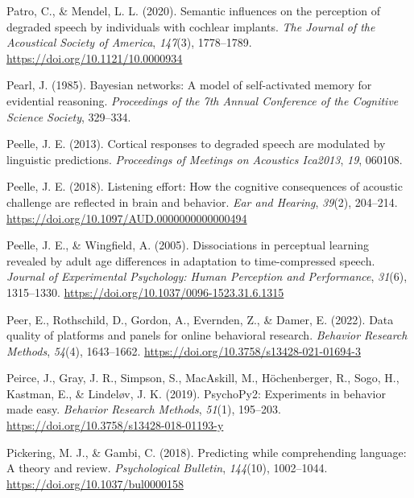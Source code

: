 \documentclass[a4paper, nobind]{templates/ociamthesis}
\newlength{\cslhangindent}
\newenvironment{CSLReferences}[2] %
 {%
  \setlength{\parindent}{0pt}
  \ifodd #1
  \let\oldpar\par
  \def\par{\hangindent=\cslhangindent\oldpar}
  \fi
  \setlength{\parskip}{1mm}
  \setlength{\baselineskip}{6mm}
 }%
 {}
\begin{document}
\begin{CSLReferences}{1}{0}
\leavevmode{}%
Patro, C., \& Mendel, L. L. (2020). Semantic influences on the perception of degraded speech by individuals with cochlear implants. \emph{The Journal of the Acoustical Society of America}, \emph{147}(3), 1778--1789. \url{https://doi.org/10.1121/10.0000934}

\leavevmode{}%
Pearl, J. (1985). {Bayesian networks: A model of self-activated memory for evidential reasoning}. \emph{Proceedings of the 7th Annual Conference of the Cognitive Science Society}, 329--334.

\leavevmode{}%
Peelle, J. E. (2013). Cortical responses to degraded speech are modulated by linguistic predictions. \emph{Proceedings of Meetings on Acoustics Ica2013}, \emph{19}, 060108.

\leavevmode{}%
Peelle, J. E. (2018). {Listening effort: How the cognitive consequences of acoustic challenge are reflected in brain and behavior}. \emph{Ear and Hearing}, \emph{39}(2), 204--214. \url{https://doi.org/10.1097/AUD.0000000000000494}

\leavevmode{}%
Peelle, J. E., \& Wingfield, A. (2005). {Dissociations in perceptual learning revealed by adult age differences in adaptation to time-compressed speech}. \emph{Journal of Experimental Psychology: Human Perception and Performance}, \emph{31}(6), 1315--1330. \url{https://doi.org/10.1037/0096-1523.31.6.1315}

\leavevmode{}%
Peer, E., Rothschild, D., Gordon, A., Evernden, Z., \& Damer, E. (2022). {Data quality of platforms and panels for online behavioral research}. \emph{Behavior Research Methods}, \emph{54}(4), 1643--1662. \url{https://doi.org/10.3758/s13428-021-01694-3}

\leavevmode{}%
Peirce, J., Gray, J. R., Simpson, S., MacAskill, M., Höchenberger, R., Sogo, H., Kastman, E., \& Lindeløv, J. K. (2019). {PsychoPy2: Experiments in behavior made easy}. \emph{Behavior Research Methods}, \emph{51}(1), 195--203. \url{https://doi.org/10.3758/s13428-018-01193-y}

\leavevmode{}%
Pickering, M. J., \& Gambi, C. (2018). Predicting while comprehending language: A theory and review. \emph{Psychological Bulletin}, \emph{144}(10), 1002--1044. \url{https://doi.org/10.1037/bul0000158}


\end{CSLReferences}
\end{document}
